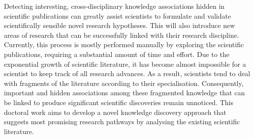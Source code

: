Detecting interesting, cross-disciplinary knowledge associations hidden in scientific publications can greatly assist scientists to formulate and validate scientifically sensible novel research hypotheses. This will also introduce new areas of research that can be successfully linked with their research discipline. Currently, this process is mostly performed manually by exploring the scientific publications, requiring a substantial amount of time and effort. Due to the exponential growth of scientific literature, it has become almost impossible for a scientist to keep track of all research advances. As a result, scientists tend to deal with fragments of the literature according to their specialisation. Consequently, important and hidden associations among these fragmented knowledge that can be linked to produce significant scientific discoveries remain unnoticed. This doctoral work aims to develop a novel knowledge discovery approach that suggests most promising research pathways by analysing the existing scientific literature.
